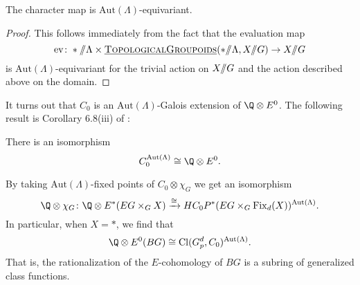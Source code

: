\begin{proposition}
The character map is $\mathrm{Aut}(\Lambda)$-equivariant.
\end{proposition}
\begin{proof}
This follows immediately from the fact that the evaluation map
\[
\mathrm{ev} \colon * \mmod \Lambda \times \InternalHom{TopologicalGroupoids}(* \mmod \Lambda, X \mmod G) \to X \mmod G
\]
is $\mathrm{Aut}(\Lambda)$-equivariant for the trivial action on $X /\!\!/ G$ and the action described above on the domain.
\end{proof}

It turns out that $C_0$ is an $\mathrm{Aut}(\Lambda)$-Galois extension of $\Q \otimes E^0$. The following result is Corollary 6.8(iii) of \cite{HKR}:
\begin{proposition}
There is an isomorphism
\[
C_{0}^{\mathrm{Aut}(\Lambda)} \cong \Q \otimes E^0.
\]
\end{proposition}

By taking $\mathrm{Aut}(\Lambda)$-fixed points of $C_0 \otimes \chi_G$ we get an isomorphism
\[
\Q \otimes \chi_G \colon \Q \otimes E^*(EG \times_G X) \xrightarrow{\cong} HC_{0}P^{*}(EG \times_G \Fix_d(X))^{\mathrm{Aut}(\Lambda)}.
\]
In particular, when $X = *$, we find that
\[
\Q \otimes E^0(BG) \cong \mathrm{Cl}(G_{p}^{d}, C_0)^{\mathrm{Aut}(\Lambda)}.
\]
That is, the rationalization of the $E$-cohomology of $BG$ is a subring of generalized class functions.
